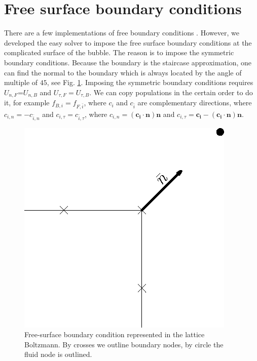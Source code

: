 \documentclass{article}
\begin{document}
\appendix
\section{Free surface boundary conditions}
\label{appendix-free-surface}
There are a few implementations of free boundary conditions \cite{ginzburg-free,verberg-free}.
However, we developed the easy solver to impose the free surface boundary conditions at the
complicated surface of the bubble. The reason is to impose the symmetric boundary conditions.
Because the boundary is the staircase approximation, one can find the normal to the boundary which
is always located by the angle of multiple of $45$, see Fig. \ref{fig:free:surface}. Imposing the
symmetric boundary conditions requires $U_{n,F}$=$U_{n,B}$ and $U_{\tau,F}=U_{\tau,B}$. We can copy
populations in the certain order to do it, for example $f_{B,i}=f_{F,\bar{i}}$, where $c_i$ and
$c_{\bar{i}}$ are complementary directions, where $c_{i,n}=-c_{\bar{i},n}$ and
$c_{i,\tau}=c_{\bar{i},\tau}$, where $c_{i,n}=(\bm{c_i} \cdot \bm{n})\bm{n}$ and
$c_{i,\tau}=\bm{c_i}-(\bm{c_i}\cdot \bm{n})\bm{n}$.  

\begin{figure}
\includegraphics[width=\textwidth]{Figures/free_surface.eps}
\caption{Free-surface boundary condition represented in the lattice Boltzmann. By crosses we outline boundary nodes, by circle the fluid node is outlined. \label{fig:free:surface}}
\end{figure}


\end{document}
